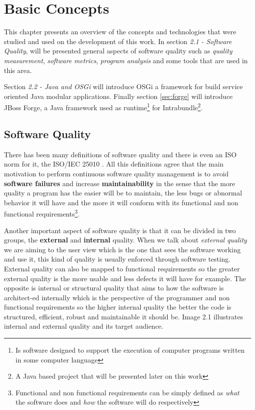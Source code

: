 \chapter{Basic Concepts}
This chapter presents an overview of the concepts and technologies that were studied and used on the development of this work. 
In section \textit{2.1 - Software Quality}, will be presented general aspects of software quality such as \textit{quality measurement},  \textit{software metrics}, \textit{program analysis} and some tools that are used in this area.  

Section \textit{2.2 - Java and OSGi} will introduce OSGi a framework for build service oriented Java modular applications. Finally section \ref{sec:forge} will introduce JBoss Forge, a Java framework used as runtime\footnote{Is software designed to support the execution of computer programs written in some computer language} for Intrabundle\footnote{A Java based project that will be presented later on this work}.   


\section{Software Quality}
\label{sec:quality}
There has been many definitions of software quality \citep[p. 23]{Kan 2002} and there is even an ISO norm for it, the ISO/IEC 25010 \citep{iso 2011}. All this definitions agree that the main motivation to perform continuous software quality management is to avoid \textbf{software failures} and increase \textbf{maintainability} in the sense that the more quality a program has the easier will be to maintain, the less bugs or abnormal behavior it will have and the more it will conform with its functional and non functional requirements\footnote{Functional and non functional requirements can be simply defined as \textit{what} the software does and \textit{how} the software will do respectively}. 

Another important aspect of software quality is that it can be divided in two groups, the \textbf{external} and \textbf{internal} quality. When we talk about \textit{external quality} we are aiming to the user view which is the one that sees the software working and use it, this kind of quality is usually enforced through software testing. External quality can also be mapped to functional requirements so the greater external quality is the more usable and less defects it will have for example. The opposite is internal or structural quality that aims to how the software is architect-ed internally which is the perspective of the programmer and non functional requirements so the higher internal quality the better the code is structured, efficient, robust and maintainable it should be. Image 2.1 illustrates internal and external quality and its target audience.


